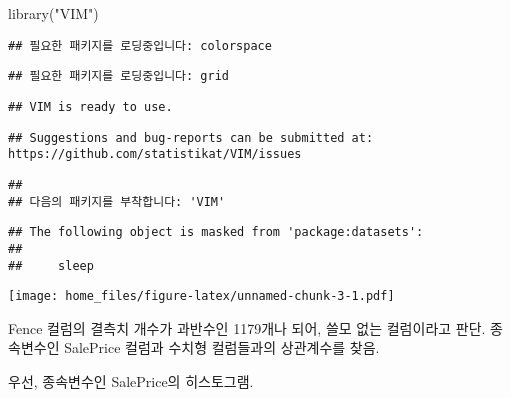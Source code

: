 \documentclass[
]{article}
\newenvironment{Shaded}{\begin{snugshade}}{\end{snugshade}}
\newcommand{\AttributeTok}[1]{\textcolor[rgb]{0.77,0.63,0.00}{#1}}
\newcommand{\ConstantTok}[1]{\textcolor[rgb]{0.00,0.00,0.00}{#1}}
\newcommand{\FunctionTok}[1]{\textcolor[rgb]{0.00,0.00,0.00}{#1}}
\newcommand{\NormalTok}[1]{#1}
\newcommand{\SpecialCharTok}[1]{\textcolor[rgb]{0.00,0.00,0.00}{#1}}
\newcommand{\StringTok}[1]{\textcolor[rgb]{0.31,0.60,0.02}{#1}}
\begin{document}
\begin{Shaded}
\begin{Highlighting}[]
\FunctionTok{library}\NormalTok{(}\StringTok{"VIM"}\NormalTok{)}
\end{Highlighting}
\end{Shaded}

\begin{verbatim}
## 필요한 패키지를 로딩중입니다: colorspace
\end{verbatim}

\begin{verbatim}
## 필요한 패키지를 로딩중입니다: grid
\end{verbatim}

\begin{verbatim}
## VIM is ready to use.
\end{verbatim}

\begin{verbatim}
## Suggestions and bug-reports can be submitted at: https://github.com/statistikat/VIM/issues
\end{verbatim}

\begin{verbatim}
## 
## 다음의 패키지를 부착합니다: 'VIM'
\end{verbatim}

\begin{verbatim}
## The following object is masked from 'package:datasets':
## 
##     sleep
\end{verbatim}

\begin{Shaded}
\end{Shaded}

\texttt{[image: home\_files/figure-latex/unnamed-chunk-3-1.pdf]}

Fence 컬럼의 결측치 개수가 과반수인 1179개나 되어, 쓸모 없는 컬럼이라고
판단. 종속변수인 SalePrice 컬럼과 수치형 컬럼들과의 상관계수를 찾음.

우선, 종속변수인 SalePrice의 히스토그램.
\end{document}
